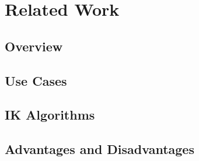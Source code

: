 \chapter{Related Work}
\section{Overview}
\section{Use Cases}
\section{IK Algorithms}
\section{Advantages and Disadvantages}
